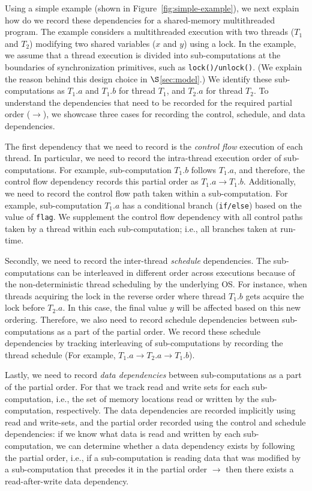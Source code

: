  Using a simple example (shown in Figure~\ref{fig:simple-example}), we next explain how do we record these dependencies for a shared-memory multithreaded program. The example considers a multithreaded execution with two threads ($T_1$ and $T_2$) modifying two shared variables ($x$ and $y$) using a lock. In the example, we assume that a thread execution is divided into sub-computations at the boundaries of synchronization primitives, such as {\tt lock()/unlock()}. (We explain the reason behind this design choice in $\S$\ref{sec:model}.) We identify these sub-computations as $T_1.a$ and $T_1.b$ for thread $T_1$, and $T_2.a$ for thread $T_2$.   To understand the dependencies that need to be recorded for the required partial order ($\rightarrow$), we showcase three cases for recording the control, schedule, and data dependencies.

The first dependency that we need to record is the {\em control flow} execution of each thread. In particular, we need to record the intra-thread execution order of sub-computations. For example, sub-computation $T_1.b$ follows $T_1.a$, and therefore, the control flow dependency records this partial order as $T_1.a \rightarrow T_1.b$. Additionally, we need to record the control flow path taken within a sub-computation. For example, sub-computation  $T_1.a$ has a conditional branch ({\tt if/else}) based on the value of {\tt flag}. We supplement the control flow dependency with all control paths taken by a thread within each sub-computation; i.e.,  all branches taken at run-time.

Secondly, we need to record the inter-thread {\em schedule} dependencies. The sub-computations can be interleaved in different order across executions because of the non-deterministic thread scheduling by the underlying OS. For instance, when threads acquiring the lock in the reverse order where thread $T_1.b$ gets acquire the lock before $T_2.a$. In this case, the final value $y$ will be affected based on this new ordering. Therefore, we also need to record schedule dependencies between sub-computations as a part of the partial order. We record these schedule dependencies by tracking interleaving of sub-computations by recording the thread schedule (For example, $T_1.a   \rightarrow   T_2.a \rightarrow T_1.b $).

Lastly,   we need to record {\em data dependencies} between sub-computations as a part of the partial order. For that we track read and write sets for each sub-computation, i.e., the set of memory locations read or written by the sub-computation, respectively. The data dependencies are recorded implicitly using read and write-sets, and the partial order recorded using the control and schedule dependencies: if we know what data is read and written by each sub-computation, we can determine whether a data dependency exists by following the partial order, i.e., if a sub-computation is reading data that was modified by a sub-computation that precedes it in the partial order $\rightarrow$ then there exists a read-after-write data dependency. 

